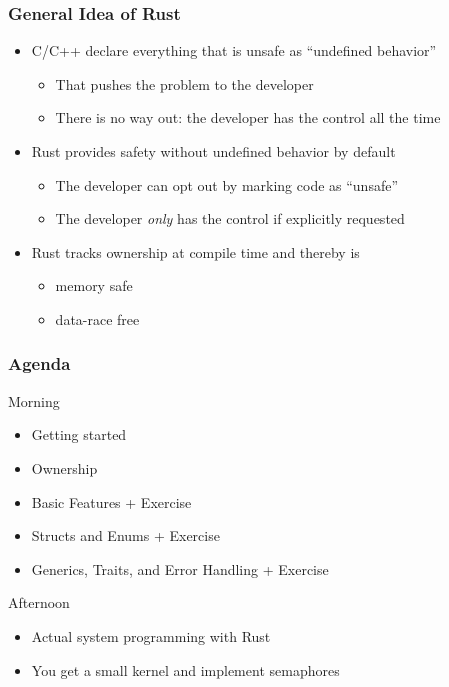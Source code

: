 \begin{frame}
    \frametitle{General Idea of Rust}

    \begin{itemize}
        \item C/C++ declare everything that is unsafe as ``undefined behavior''
        \begin{itemize}
            \item That pushes the problem to the developer
            \item There is no way out: the developer has the control all the time
        \end{itemize}

        \pause

        \item Rust provides safety without undefined behavior by default
        \begin{itemize}
            \item The developer can opt out by marking code as ``unsafe''
            \item The developer \emph{only} has the control if explicitly requested
        \end{itemize}

        \pause

        \item Rust tracks ownership at compile time and thereby is
        \begin{itemize}
            \item memory safe
            \item data-race free
        \end{itemize}
    \end{itemize}
\end{frame}

\begin{frame}
    \frametitle{Agenda}

    \begin{block}{Morning}
    \begin{itemize}
        \item Getting started
        \item Ownership
        \item Basic Features + Exercise
        \item Structs and Enums + Exercise
        \item Generics, Traits, and Error Handling + Exercise
    \end{itemize}
    \end{block}

    \pause

    \begin{block}{Afternoon}
    \begin{itemize}
        \item Actual system programming with Rust
        \item You get a small kernel and implement semaphores
    \end{itemize}
    \end{block}
\end{frame}

